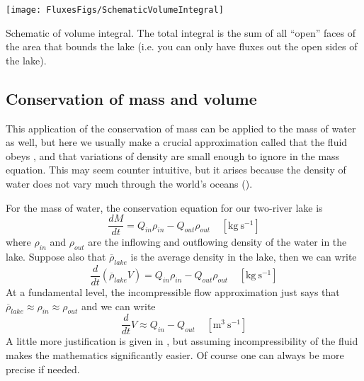 \begin{marginfigure}
    \texttt{[image: FluxesFigs/SchematicVolumeIntegral]}
    \caption{Schematic of volume integral.  The total integral is the sum of all ``open'' faces of the area that bounds the lake (i.e. you can only have fluxes out the open sides of the lake).}
\end{marginfigure}






\subsection{Conservation of mass and volume}

This application of the conservation of mass can be applied to the mass of water as well, but here we usually make a crucial approximation called that the fluid obeys , and that variations of density are small enough to ignore in the mass equation.  This may seem counter intuitive, but it arises because the density of water does not vary much through the world's oceans (). 

For the mass of water, the conservation equation for our two-river lake is 
\begin{equation}
    \frac{dM}{dt} = Q_{in}\rho_{in} - Q_{out}\rho_{out}  \ \ \ \ \ \mathrm{\left[kg\ s^{-1}\right]}
\end{equation}
where $\rho_{in}$ and $\rho_{out}$ are the inflowing and outflowing density of the water in the lake.  Suppose also that $\overline{\rho}_{lake}$ is the average density in the lake, then we can write
\begin{equation}
    \frac{d}{dt}\left(\overline{\rho}_{lake} V \right) = Q_{in}\rho_{in} - Q_{out}\rho_{out}  \ \ \ \ \ \mathrm{\left[kg\ s^{-1}\right]}
    \label{eq:Mass}
\end{equation}
At a fundamental level, the incompressible flow approximation just says that $\overline{\rho}_{lake} \approx \rho_{in} \approx \rho_{out}$ and we can write
\begin{equation}
    \frac{d}{dt} V  \approx Q_{in} - Q_{out}  \ \ \ \ \ \mathrm{\left[m^{3}\ s^{-1}\right]}
    \label{eq:Volume}
\end{equation}
A little more justification is given in , but assuming incompressibility of the fluid makes the mathematics significantly easier.  Of course one can always be more precise if needed.  



